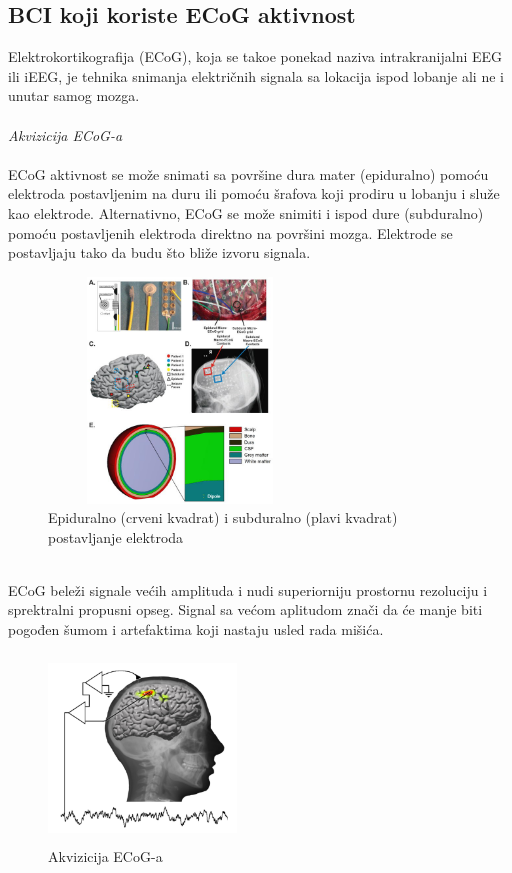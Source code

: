 \documentclass[conference]{IEEEtran}
\begin{document}
\subsection{BCI koji koriste ECoG aktivnost}
Elektrokortikografija (ECoG), koja se tako\dj e ponekad naziva intrakranijalni EEG ili iEEG, je tehnika snimanja električnih signala sa lokacija ispod lobanje ali ne i unutar samog mozga. \\
\\
\textit{Akvizicija ECoG-a}\\
\\
ECoG aktivnost se može snimati sa površine dura mater (epiduralno) pomoću elektroda postavljenim na duru ili pomoću šrafova koji prodiru u lobanju i služe kao elektrode. Alternativno, ECoG se može snimiti i ispod dure (subduralno) pomoću postavljenih elektroda direktno na površini mozga. Elektrode se postavljaju tako da budu što bliže izvoru signala. \\
\begin{figure}[htp]
\centerline{\includegraphics[width=7cm, height=6cm]{epi sub dural.jpg}}
\caption{Epiduralno (crveni kvadrat) i subduralno (plavi kvadrat) postavljanje elektroda}
\label{Slika}
\end{figure}\\
ECoG beleži signale većih amplituda i nudi superiorniju prostornu rezoluciju i sprektralni propusni opseg. Signal sa većom aplitudom znači da će manje biti pogođen šumom i artefaktima koji nastaju usled rada mišića.
\begin{figure}[htp]
\centerline{\includegraphics[width=5cm, height=5cm]{ECOG akv.png}}
\caption{Akvizicija ECoG-a}
\label{Slika}
\end{figure} 
\end{document}
